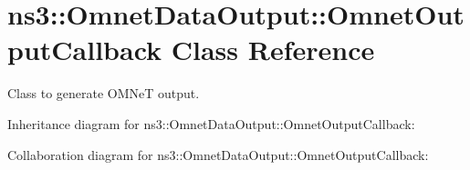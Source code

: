 \hypertarget{classns3_1_1OmnetDataOutput_1_1OmnetOutputCallback}{}\section{ns3\+:\+:Omnet\+Data\+Output\+:\+:Omnet\+Output\+Callback Class Reference}
\label{classns3_1_1OmnetDataOutput_1_1OmnetOutputCallback}


Class to generate O\+M\+NeT output.  




Inheritance diagram for ns3\+:\+:Omnet\+Data\+Output\+:\+:Omnet\+Output\+Callback\+:


Collaboration diagram for ns3\+:\+:Omnet\+Data\+Output\+:\+:Omnet\+Output\+Callback\+:
